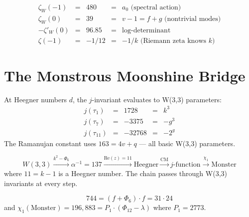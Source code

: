 \begin{corollary}
\begin{equation}
\renewcommand{\arraystretch}{1.4}
\begin{array}{rclcl}
\zeta_W(-1) &=& 480 &=& a_0\text{ (spectral action)} \\
\zeta_W(0) &=& 39 &=& v-1 = f+g\text{ (nontrivial modes)} \\
-\zeta'_W(0) &=& 96.85 &=& \text{log-determinant} \\
\zeta(-1) &=& -1/12 &=& -1/k\text{ (Riemann zeta knows $k$)}
\end{array}
\end{equation}
\end{corollary}


\section{The Monstrous Moonshine Bridge}
\label{sec:moonshine-bridge}

\begin{theorem}
\label{thm:cm}
At Heegner numbers $d$, the $j$-invariant evaluates to W(3,3) parameters:
\begin{equation}
\renewcommand{\arraystretch}{1.4}
\begin{array}{rclcl}
j(\tau_1) &=& 1728 &=& k^3 \\
j(\tau_7) &=& -3375 &=& -g^3 \\
j(\tau_{11}) &=& -32768 &=& -2^g
\end{array}
\end{equation}
The Ramanujan constant uses $163 = 4v+q$ --- all basic W(3,3) parameters.
\end{theorem}

\begin{theorem}
\begin{equation}
W(3,3) \xrightarrow{k^2-\Phi_6} \alpha^{-1}=137
\xrightarrow{\text{Re}(z)=11} \text{Heegner}
\xrightarrow{\text{CM}} j\text{-function}
\xrightarrow{\chi_1} \text{Monster}
\end{equation}
where $11 = k-1$ is a Heegner number. The chain passes through W(3,3)
invariants at every step.
\end{theorem}

\begin{theorem}
\begin{equation}
744 = (f+\Phi_6)\cdot f = 31\cdot 24
\end{equation}
and $\chi_1(\mathrm{Monster}) = 196{,}883 = P_1\cdot(\Phi_{12}-\lambda)$
where $P_1 = 2773$.
\end{theorem}


